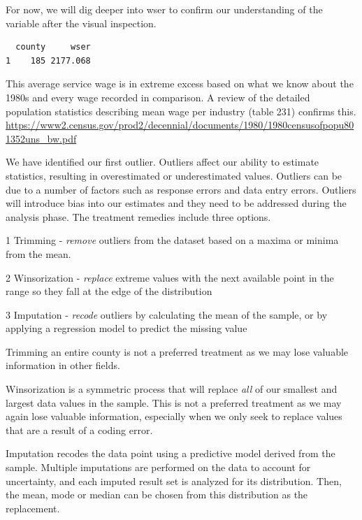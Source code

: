 \documentclass[]{article}
\newenvironment{Shaded}{}{}
\newcommand{\DecValTok}[1]{#1}
\newcommand{\KeywordTok}[1]{\textcolor[rgb]{0.00,0.00,1.00}{#1}}
\newcommand{\NormalTok}[1]{#1}
\newcommand{\OperatorTok}[1]{#1}
\newcommand{\StringTok}[1]{\textcolor[rgb]{0.00,0.50,0.50}{#1}}
\begin{document}
For now, we will dig deeper into wser to confirm our understanding of
the variable after the visual inspection.

\begin{Shaded}
\end{Shaded}

\begin{verbatim}
  county     wser
1    185 2177.068
\end{verbatim}

This average service wage is in extreme excess based on what we know
about the 1980s and every wage recorded in comparison. A review of the
detailed population statistics describing mean wage per industry (table
231) confirms this.
\url{https://www2.census.gov/prod2/decennial/documents/1980/1980censusofpopu801352uns_bw.pdf}

We have identified our first outlier. Outliers affect our ability to
estimate statistics, resulting in overestimated or underestimated
values. Outliers can be due to a number of factors such as response
errors and data entry errors. Outliers will introduce bias into our
estimates and they need to be addressed during the analysis phase. The
treatment remedies include three options.

1 Trimming - \emph{remove} outliers from the dataset based on a maxima
or minima from the mean.

2 Winsorization - \emph{replace} extreme values with the next available
point in the range so they fall at the edge of the distribution

3 Imputation - \emph{recode} outliers by calculating the mean of the
sample, or by applying a regression model to predict the missing value

Trimming an entire county is not a preferred treatment as we may lose
valuable information in other fields.

Winsorization is a symmetric process that will replace \emph{all} of our
smallest and largest data values in the sample. This is not a preferred
treatment as we may again lose valuable information, especially when we
only seek to replace values that are a result of a coding error.

Imputation recodes the data point using a predictive model derived from
the sample. Multiple imputations are performed on the data to account
for uncertainty, and each imputed result set is analyzed for its
distribution. Then, the mean, mode or median can be chosen from this
distribution as the replacement.
\end{document}
